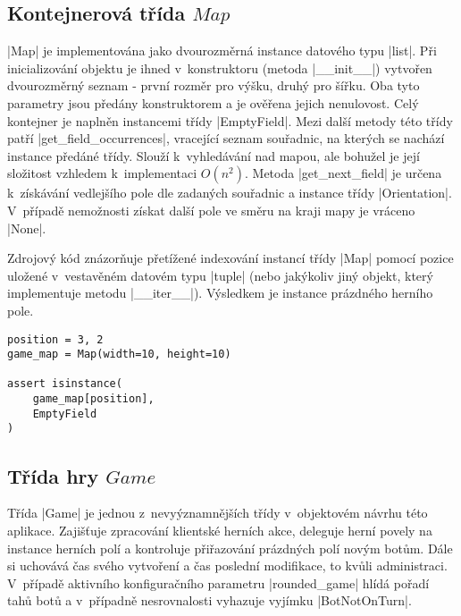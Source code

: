 \subsection{Kontejnerová třída $Map$}

\begin{sloppypar}
    \ic|Map| je implementována jako dvourozměrná instance datového typu \ic|list|. Při inicializování objektu je ihned v~konstruktoru (metoda \ic|__init__|) vytvořen dvourozměrný seznam - první rozměr pro výšku, druhý pro šířku. Oba tyto parametry jsou předány konstruktorem a je ověřena jejich nenulovost. Celý kontejner je naplněn instancemi třídy \ic|EmptyField|. Mezi další metody této třídy patří \ic|get_field_occurrences|, vracející seznam souřadnic, na kterých se nachází instance předáné třídy. Slouží k~vyhledávání nad mapou, ale bohužel je její složitost vzhledem k~implementaci $O(n^2)$. Metoda \ic|get_next_field| je určena k~získávání vedlejšího pole dle zadaných souřadnic a instance třídy \ic|Orientation|. V~případě nemožnosti získat další pole ve směru na kraji mapy je vráceno \ic|None|.
\end{sloppypar}

Zdrojový kód znázorňuje přetížené indexování instancí třídy \ic|Map| pomocí pozice uložené v~vestavěném datovém typu \ic|tuple| (nebo jakýkoliv jiný objekt, který implementuje metodu \ic|__iter__|). Výsledkem je instance prázdného herního pole.

\begin{lstlisting}[caption={Přetížené indexování třídy $Map$},label={lst:map-indexing}]
position = 3, 2
game_map = Map(width=10, height=10)

assert isinstance(
	game_map[position],
	EmptyField
)
\end{lstlisting}

\subsection{Třída hry $Game$}

Třída \ic|Game| je jednou z~nevyýznamnějších třídy v~objektovém návrhu této aplikace. Zajišťuje zpracování klientské herních akce, deleguje herní povely na instance herních polí a kontroluje přiřazování prázdných polí novým botům. Dále si uchovává čas svého vytvoření a čas poslední modifikace, to kvůli administraci. V~případě aktivního konfiguračního parametru \ic|rounded_game| hlídá pořadí tahů botů a v~případně nesrovnalosti vyhazuje vyjímku \ic|BotNotOnTurn|.

